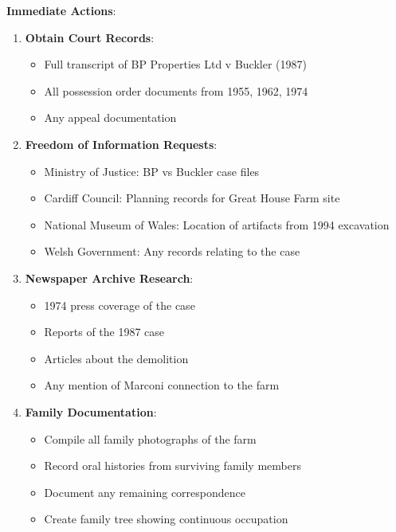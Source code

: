 \documentclass[11pt,a4paper]{article}
\begin{document}
\begin{action}
\textbf{Immediate Actions}:
\begin{enumerate}[label=\arabic*.]
    \item \textbf{Obtain Court Records}:
    \begin{itemize}
        \item Full transcript of BP Properties Ltd v Buckler (1987)
        \item All possession order documents from 1955, 1962, 1974
        \item Any appeal documentation
    \end{itemize}
    
    \item \textbf{Freedom of Information Requests}:
    \begin{itemize}
        \item Ministry of Justice: BP vs Buckler case files
        \item Cardiff Council: Planning records for Great House Farm site
        \item National Museum of Wales: Location of artifacts from 1994 excavation
        \item Welsh Government: Any records relating to the case
    \end{itemize}
    
    \item \textbf{Newspaper Archive Research}:
    \begin{itemize}
        \item 1974 press coverage of the case
        \item Reports of the 1987 case
        \item Articles about the demolition
        \item Any mention of Marconi connection to the farm
    \end{itemize}
    
    \item \textbf{Family Documentation}:
    \begin{itemize}
        \item Compile all family photographs of the farm
        \item Record oral histories from surviving family members
        \item Document any remaining correspondence
        \item Create family tree showing continuous occupation
    \end{itemize}
\end{enumerate}
\end{action}
\end{document}

